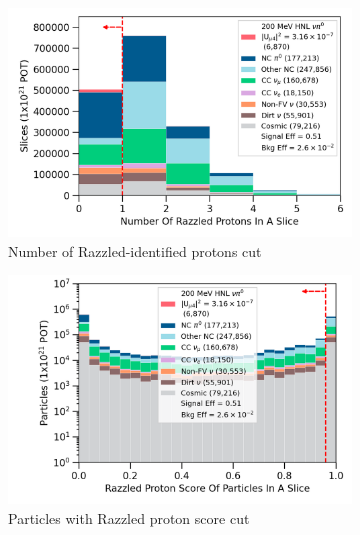 \begin{figure}[b!]
        \begin{subfigure}[b]{0.495\textwidth}   
            \centering 
            \includegraphics[width=\textwidth]{nrazzled_proton_precut}
            \caption{Number of Razzled-identified protons cut}%
            \label{fig:nrazzled_proton_full}
        \end{subfigure}
        \hfill
        \begin{subfigure}[b]{0.495\textwidth}   
            \centering 
            \includegraphics[width=\textwidth]{razzled_proton_score_precut}
            \caption{Particles with Razzled proton score cut}%
            \label{fig:razzled_proton_score_full}
        \end{subfigure}
        \hfill
	\centering
        \begin{subfigure}[b]{0.495\textwidth}   
            \centering 

\end{subfigure}
\end{figure}
